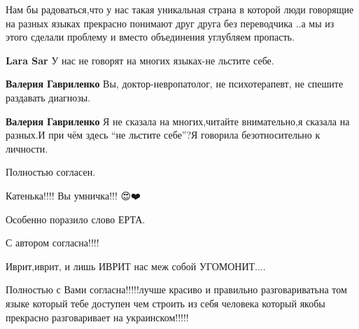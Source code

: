 Нам бы радоваться,что у нас такая уникальная страна в которой люди говорящие на разных языках прекрасно понимают друг друга без переводчика ..а мы из этого сделали проблему и вместо объединения углубляем пропасть.

\begin{itemize}
\textbf{Lara Sar} У нас не говорят на многих языках-не льстите себе.

\textbf{Валерия Гавриленко} Вы, доктор-невропатолог, не психотерапевт, не спешите раздавать диагнозы.

\textbf{Валерия Гавриленко} Я не сказала на многих,читайте внимательно,я сказала на разных.И при чём здесь \enquote{не льстите себе}?Я говорила безотносительно к личности.
\end{itemize}

Полностью согласен.

Катенька!!!! Вы умничка!!! 😍❤️🌹😘😘😘

Особенно поразило слово ЕРТА.

С автором согласна!!!!

Иврит,иврит, и лишь ИВРИТ нас меж собой УГОМОНИТ....


Полностью с Вами согласна!!!!!лучше красиво и правильно разговариватьна том
языке который тебе доступен чем строить из себя человека который якобы
прекрасно разговаривает на украинском!!!!!

